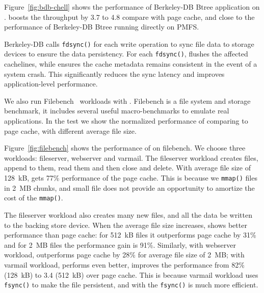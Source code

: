 Figure~\ref{fig:bdb-chell} shows the performance of Berkeley-DB Btree
application on \CChell{}.  \Chell{} boosts the
throughput by 3.7\x{} to 4.8\x{} compare with page cache, and close to the
performance of Berkeley-DB Btree running directly on PMFS.

Berkeley-DB calls \texttt{fdsync()} for each
write operation to sync
file data to storage devices to ensure the data persistency.
For each \texttt{fdsync()}, \lib{} flushes the affected cachelines, while \drv{} ensures the cache metadata remains consistent in the event of a system crash.  This significantly reduces the sync latency and improves application-level performance.



We also run Filebench~\cite{filebench} workloads with \CChell{}. Filebench
is a file system and storage benchmark, it includes several useful
macro-benchmarks to emulate real applications. In the test we show the
normalized performance of \CChell{} comparing to page cache, with different
average file size.

Figure~\ref{fig:filebench} shows the performance of \CChell{} on filebench.
We choose three workloads: fileserver, webserver and varmail.
The fileserver workload creates files, append to them, read them and
then close and delete.
With average file size of 128~kB, \CChell{} gets 77\% performance
of the page cache. This is because we \texttt{mmap()} files in 2~MB chunks,
and small file does not provide an opportunity to amortize the cost of the \texttt{mmap()}.   The fileserver workload also creates many new files,
and all the data be written to the backing store device.  When the average file size increases, \CChell{} shows better
performance than page cache: for 512~kB files it outperforms page cache
by 31\% and for 2~MB files the performance gain is 91\%. Similarly, with
webserver workload, \CChell{} outperforms page cache by 28\% for average
file size of 2~MB; with varmail workload, \CChell{} performs even better,
improves the performance from 82\% (128~kB) to 3.4\x{} (512~kB) over page cache.
This is because varmail workload uses \texttt{fsync()} to make the file
persistent, and with \CChell{} the \texttt{fsync()} is much more efficient.

